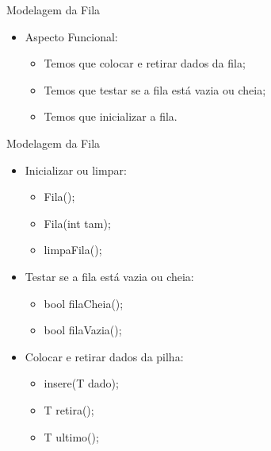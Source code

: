 \documentclass[12pt,table,xcolor={dvipsnames}]{beamer}
\begin{document}
\begin{frame}[fragile]{Modelagem da Fila}

\begin{itemize}
\item Aspecto Funcional:
\begin{itemize}
\item Temos que colocar e retirar dados da fila;
\item Temos que testar se a fila está vazia ou cheia;
\item Temos que inicializar a fila.
\end{itemize}
\end{itemize}
\end{frame}

\begin{frame}[fragile]{Modelagem da Fila}

\begin{itemize}
\item Inicializar ou limpar:
\begin{itemize}
\item Fila();
\item Fila(int tam);
\item limpaFila();
\end{itemize}
\item Testar se a fila está vazia ou cheia:
\begin{itemize}
\item bool filaCheia();
\item bool filaVazia();
\end{itemize}
\item Colocar e retirar dados da pilha:
\begin{itemize}
\item insere(T dado);
\item T retira();
\item T ultimo();
\end{itemize}
\end{itemize}
\end{frame}
\end{document}
